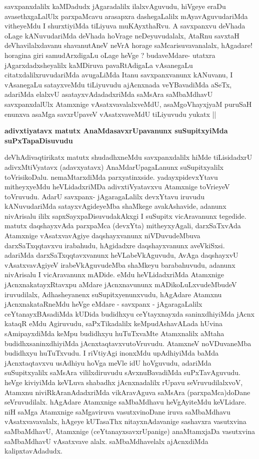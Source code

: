 \begin{artha}
savxpanxdalilx kaMDadudx jAgaradalilx ilalxvAguvudu, hiVgeye eraDu
avasethxgaLalUlx parxpaMcavu arasapxra dashegaLalilx
mAyavAguvudariMda vitheyeMdu I shurxtiyiMda tiLiyuva muKAyxthaRvu.
A savxpanxvu deVhada oLage kANuvudariMda deVhada hoVrage
neDeyuvudalalx, AtaRnu savxtaH deVhavilalxdavanu shavanutAneV neVrA
horage saMcarisuvavanalalx, hAgadare! horagina giri samudArxdigaLu
oLage heVge ? budaveMdare- utatxra jAgarxdadxsheyalilx kaMDiruva
pavaRtAdigaLa vAsanegaLu citatxdalilxruvudariMda avugaLiMda Itanu
savxpanxvanunx kANuvanu, I vAsanegaLu satayxveMdu tiLiyuvudu
ajAcnxnada veYBavadiMda aSeTx, adariMda elalxvU asatayxvAdadadxriMda
saMsAra saMbaMdhavU savxpanxdalUlx Atamxnige vAsatxvavalalxveMdU,
asaMgoVhayxjyaM puruSaH enunxva asaMga savxrUpaveV vAsatxvaveMdU
tiLiyuvudu yukatx ||  
\end{artha}

\begin{center}
\begin{artha}
\bf{adivxtiyatavx matutx AnaMdasavxrUpavanunx suSupitxyiMda suPxTapaDisuvudu}
\end{artha}
\end{center}

\begin{artha}
deVhAdivaqtirikatx matutx shudadhxneMdu savxpanxdalilx hiMde
tiLisidadxrU adivxMtiVyatavx  (adavxyatavx) AnaMdarUpagaLanunx
suSupitxyalilx toVrisikoDalu. 
nemaMtarxdiMda parxyatinxside. yadayxpidevxYtavu mitheyxyeMdu heVLidadxriMDa
adivxtiVyatavxvu Atamxnige toVrieyeV  toVruvudu. AdarU savxpanx-
jAgaragaLalilx devxYtavu iruvudu kANuvudariMda satayxvAgideyeMba
shaMkege avakAshavide, adanunx nivArisalu ililx
sapxSayxpaDisuvudakAkxgi I suSupitx vicAravanunx tegedide. matutx
daqshayxvAda parxpaMca (devxYta) mitheyxyAgali, darxSaTxvAda Atamxnige
vAsatxvavAgiye daqshayxvanunx niVDuvudeMbuva darxSaTxqqtavxvu
irabahudu, hAgidadxre daqshayxvanunx aveVkiSxsi. adariMda
darxSaTxqqtavxvanunx heVLabeVkAguvudu, AvAga daqshayxvU
vAsatxvavAgiyeV irabeVkAguvudeMba shaMkeyu barabahuvudu, adanunx
nivArisalu I vicAravanunx mADide. eMdu heVLidadxriMda Atamxnige
jAcnxnakatayxRtavxpu aMdare jAcnxnavununx mADikoLuLxvudeMbudeV
iruvudilalx, Adhasheyanenx suSupitxyenunxvudu, hAgAdare Atamxnu
jAcnxnakataRneMdu heVge eMdare - savxpanx - jAgaragaLalilx
ceYtanayxBAsadiMda kUDida budidhxyu ceYtayxnayxda saninxdhiyiMda jAcnx
kataqR eMdu Agiruvudu, saPxTikadalilx keMpudAshavALada hUvina
sAmipayxdiMda keMpu budidhxyu huTuTxvaMte Atamxnalilx aMtaha
budidhxsaninxdhiyiMda jAcnxtaqtavxvutoVruvudu. AtamxneV noVDuvaneMba
budidhxyu huTuTxvudu. I riVtiyAgi inonxMdu upAdhiyiMda baMda
jAcnxtaqtavxvu usAdhiyu hoVga meVle idU hoVguvudu, adariMda
suSupitxyalilx saMsAra vililxdiruvudu sAvxnuBavadiMda
suPxTavAguvudu. heVge kiviyiMda keVLuva shabadhx jAcnxnadalilx rUpavu
seVruvudilalxvoV, Atamxnu niviRkAranAdadxriMda vikAravAguva saMsAra
(parxpaMca)doDane seVruvudilalx. hAgAdare Atamxnige saMbaMdhavu
heVgAyiteMdu keVLidare. niH saMga Atamxnige saMgaviruva
vasutxvinoDane iruva saMbaMdhavu vAsatxvavavalalx, hAgeye kUTasaThx
nitayxnAdavanige sashavxra vasutxvina saMbaMdhavU, Atamxnige
(ceYtanayxsavxrUpanige) anaMtamxjaDa vasutxvina saMbaMdhavU
vAsatxvave alalx. saMbaMdhavelalx ajAcnxdiMda kalipxtavAdadudx.
\end{artha}


